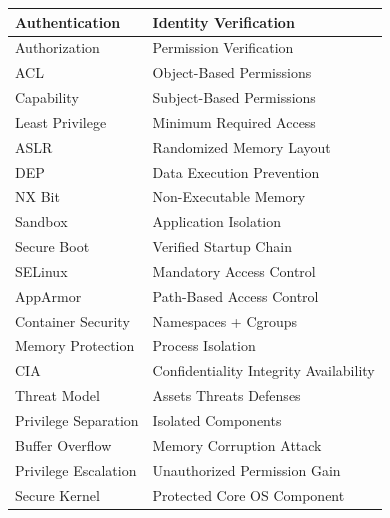 \begin{center}
\begin{tabular}{|p{5cm}|p{8cm}|}
\hline
Authentication & Identity Verification \\
\hline
Authorization & Permission Verification \\
\hline
ACL & Object-Based Permissions \\
\hline
Capability & Subject-Based Permissions \\
\hline
Least Privilege & Minimum Required Access \\
\hline
ASLR & Randomized Memory Layout \\
\hline
DEP & Data Execution Prevention \\
\hline
NX Bit & Non-Executable Memory \\
\hline
Sandbox & Application Isolation \\
\hline
Secure Boot & Verified Startup Chain \\
\hline
SELinux & Mandatory Access Control \\
\hline
AppArmor & Path-Based Access Control \\
\hline
Container Security & Namespaces + Cgroups \\
\hline
Memory Protection & Process Isolation \\
\hline
CIA & Confidentiality Integrity Availability \\
\hline
Threat Model & Assets Threats Defenses \\
\hline
Privilege Separation & Isolated Components \\
\hline
Buffer Overflow & Memory Corruption Attack \\
\hline
Privilege Escalation & Unauthorized Permission Gain \\
\hline
Secure Kernel & Protected Core OS Component \\
\hline
\end{tabular}
\end{center}